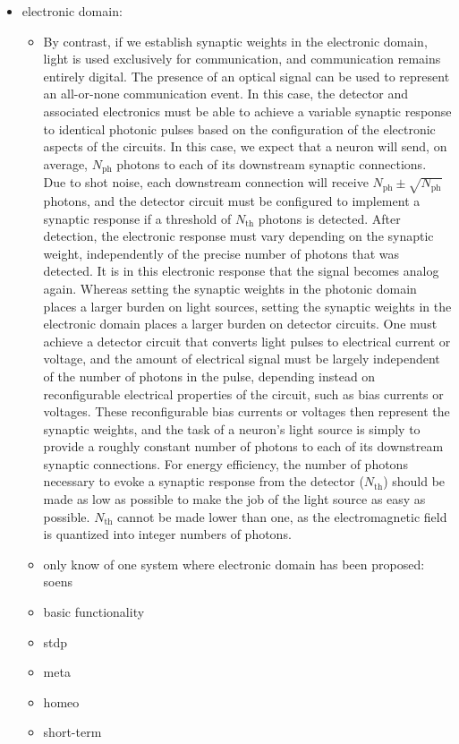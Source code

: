 \documentclass[twocolumn]{article}
\begin{document}
\begin{itemize}
\item electronic domain:
\begin{itemize}
\item By contrast, if we establish synaptic weights in the electronic domain, light is used exclusively for communication, and communication remains entirely digital. The presence of an optical signal can be used to represent an all-or-none communication event. In this case, the detector and associated electronics must be able to achieve a variable synaptic response to identical photonic pulses based on the configuration of the electronic aspects of the circuits. In this case, we expect that a neuron will send, on average, $N_{\mathrm{ph}}$ photons to each of its downstream synaptic connections. Due to shot noise, each downstream connection will receive $N_{\mathrm{ph}}\pm\sqrt{N_{\mathrm{ph}}}$ photons, and the detector circuit must be configured to implement a synaptic response if a threshold of $N_{\mathrm{th}}$ photons is detected. After detection, the electronic response must vary depending on the synaptic weight, independently of the precise number of photons that was detected. It is in this electronic response that the signal becomes analog again. Whereas setting the synaptic weights in the photonic domain places a larger burden on light sources, setting the synaptic weights in the electronic domain places a larger burden on detector circuits. One must achieve a detector circuit that converts light pulses to electrical current or voltage, and the amount of electrical signal must be largely independent of the number of photons in the pulse, depending instead on reconfigurable electrical properties of the circuit, such as bias currents or voltages. These reconfigurable bias currents or voltages then represent the synaptic weights, and the task of a neuron's light source is simply to provide a roughly constant number of photons to each of its downstream synaptic connections. For energy efficiency, the number of photons necessary to evoke a synaptic response from the detector ($N_{\mathrm{th}}$) should be made as low as possible to make the job of the light source as easy as possible. $N_{\mathrm{th}}$ cannot be made lower than one, as the electromagnetic field is quantized into integer numbers of photons.
\item only know of one system where electronic domain has been proposed: soens
\item basic functionality
\item stdp
\item meta
\item homeo
\item short-term
\end{itemize}


\end{itemize}
\end{document}
